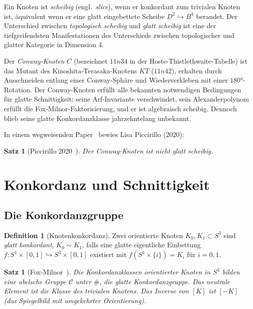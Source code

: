 \documentclass[12pt,a4paper]{amsart}
\newtheorem{satz}[theorem]{Satz}
\theoremstyle{definition}
\newtheorem{definition_de}[theorem]{Definition}
\theoremstyle{remark}
\begin{document}
Ein Knoten ist \emph{scheibig} (engl.\ \emph{slice}), wenn er konkordant
zum trivialen Knoten ist, äquivalent wenn er eine glatt eingebettete Scheibe
$D^2 \hookrightarrow B^4$ berandet. Der Unterschied zwischen
\emph{topologisch scheibig} und \emph{glatt scheibig} ist eine der
tiefgreifendsten Manifestationen des Unterschieds zwischen topologischer und
glatter Kategorie in Dimension 4.

Der \emph{Conway-Knoten} $C$ (bezeichnet $11n34$ in der Hoste-Thistlethwaite-Tabelle)
ist das Mutant des Kinoshita-Terasaka-Knotens $KT$ ($11n42$), erhalten durch
Ausschneiden entlang einer Conway-Sphäre und Wiederverkleben mit einer
$180°$-Rotation. Der Conway-Knoten erfüllt alle bekannten notwendigen
Bedingungen für glatte Schnittigkeit: seine Arf-Invariante verschwindet,
sein Alexanderpolynom erfüllt die Fox-Milnor-Faktorisierung, und er ist
algebraisch scheibig. Dennoch blieb seine glatte Konkordanzklasse
jahrzehntelang unbekannt.

In einem wegweisenden Paper~\cite{Piccirillo2020} bewies Lisa Piccirillo (2020):

\begin{satz}[Piccirillo 2020~\cite{Piccirillo2020}]
\label{satz:Piccirillo}
Der Conway-Knoten ist nicht glatt scheibig.
\end{satz}

\section{Konkordanz und Schnittigkeit}

\subsection{Die Konkordanzgruppe}

\begin{definition_de}[Knotenkonkordanz]
Zwei orientierte Knoten $K_0, K_1 \subset S^3$ sind \emph{glatt konkordant},
$K_0 \sim K_1$, falls eine glatte eigentliche Einbettung
$f \colon S^1 \times [0,1] \hookrightarrow S^3 \times [0,1]$
existiert mit $f(S^1 \times \{i\}) = K_i$ für $i = 0, 1$.
\end{definition_de}

\begin{satz}[Fox-Milnor~\cite{FoxMilnor1966}]
Die Konkordanzklassen orientierter Knoten in $S^3$ bilden eine abelsche
Gruppe $\mathcal{C}$ unter $\#$, die \emph{glatte Konkordanzgruppe}.
Das neutrale Element ist die Klasse des trivialen Knotens. Das Inverse von
$[K]$ ist $[-K]$ (das Spiegelbild mit umgekehrter Orientierung).
\end{satz}
\end{document}
